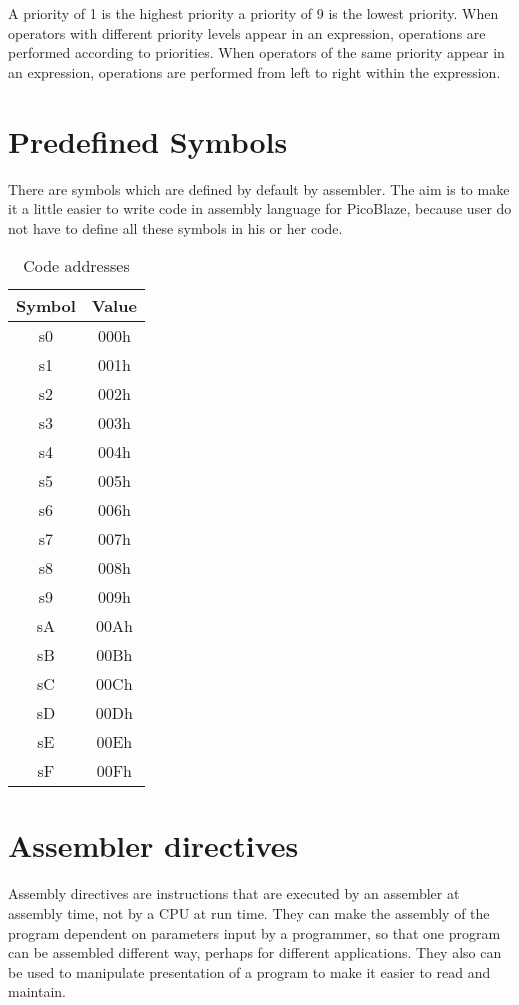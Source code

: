     A priority of 1 is the highest priority a priority of 9 is the lowest priority. When operators with different priority levels appear in an expression, operations are performed according to priorities. When operators of the same priority appear in an expression, operations are performed from left to right within the expression.

\section{Predefined Symbols}
    There are symbols which are defined by default by assembler. The aim is to make it a little easier to write code in assembly language for PicoBlaze, because user do not have to define all these symbols in his or her code.

    \begin{table}[h!]
        \centering{}
        \mysmallfont{}

        \begin{tabular}{|cc|}
            \hline
            Symbol & Value \\\hline
            s0     & 000h  \\\hline
            s1     & 001h  \\\hline
            s2     & 002h  \\\hline
            s3     & 003h  \\\hline
            s4     & 004h  \\\hline
            s5     & 005h  \\\hline
            s6     & 006h  \\\hline
            s7     & 007h  \\\hline
            s8     & 008h  \\\hline
            s9     & 009h  \\\hline
            sA     & 00Ah  \\\hline
            sB     & 00Bh  \\\hline
            sC     & 00Ch  \\\hline
            sD     & 00Dh  \\\hline
            sE     & 00Eh  \\\hline
            sF     & 00Fh  \\\hline
        \end{tabular}

        \caption{Code addresses}
    \end{table}

\section{Assembler directives}
    Assembly directives are instructions that are executed by an assembler at assembly time, not by a CPU at run time. They can make the assembly of the program dependent on parameters input by a programmer, so that one program can be assembled different way, perhaps for different applications. They also can be used to manipulate presentation of a program to make it easier to read and maintain.

